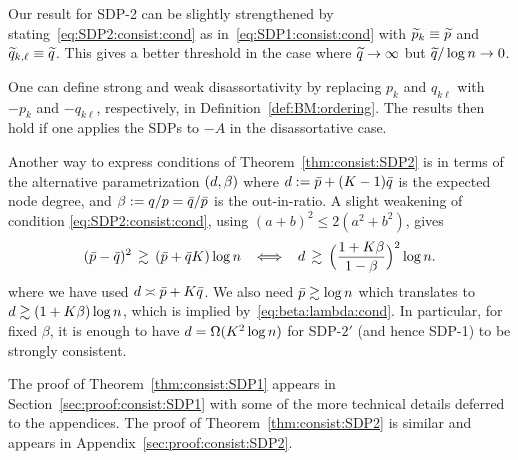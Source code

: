 \begin{rem}\label{rem:SDP2:result:strength}
Our result for SDP-2 can be slightly strengthened by stating~\eqref{eq:SDP2:consist:cond} as in~\eqref{eq:SDP1:consist:cond} with $\widetilde{p}_k \equiv \widetilde{p}$ and $\widetilde{q}_{k,\ell} \equiv \widetilde{q}$. This gives a better threshold in the case where $\widetilde{q} \to \infty$ but $\widetilde{q}/\log n \to 0$.
\end{rem}

\begin{rem}
  One can define strong and weak disassortativity by replacing $p_k$ and $q_{k\ell}$ with $-p_k$ and $-q_{k \ell}$, respectively, in Definition~\ref{def:BM:ordering}. The results then hold if one applies the SDPs to $-A$ in the disassortative case.
\end{rem}

\begin{rem} 
 Another way to express conditions of Theorem~\ref{thm:consist:SDP2} is in terms of the alternative parametrization $(d,\beta)$ where $d := \bar{p} + (K-1) \bar{q}$ is the expected node degree, and $\beta := q/p = \bar{q}/\bar{p}$ is the out-in-ratio. A slight weakening of condition \eqref{eq:SDP2:consist:cond}, using $(a+b)^2 \le 2(a^2 + b^2)$, gives
  \begin{align}\label{eq:beta:lambda:cond}
    (\bar{p} - \bar{q})^2 \, \gtrsim\, (\bar{p} + \bar{q} K) \log n \;\;\iff\;\; 
      d \,\gtrsim\, \Big( \frac{1+K \beta}{1-\beta}\Big)^2 \log n.
  \end{align}
  where we have used $d \asymp \bar{p} + K \bar{q}$.  We also need $\bar{p} \gtrsim \log n$ which translates to $d \gtrsim (1+K\beta) \log n$, which is implied by~\eqref{eq:beta:lambda:cond}. In particular, for fixed $\beta$, it is enough to have $d = \Omega(K^2 \log n)$ for SDP-$2'$ (and hence SDP-1) to be strongly consistent.
\end{rem}

The proof of Theorem~\ref{thm:consist:SDP1} appears in Section~\ref{sec:proof:consist:SDP1} with some of the more technical details deferred to the appendices.
The proof of Theorem~\ref{thm:consist:SDP2} is similar and appears in Appendix~\ref{sec:proof:consist:SDP2}.

